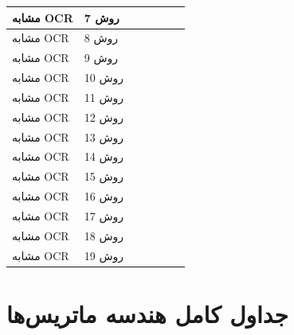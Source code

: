 \documentclass[a4paper,12pt]{article}
\begin{document}
\begin{landscape}
\begin{longtable}{|C{2cm}|C{2.5cm}|C{2.4cm}|C{2.4cm}|C{2.4cm}|C{2.5cm}|C{2.7cm}|}
\hline
مشابه OCR & روش 7 &  &  &  &  &  \\
\hline
مشابه OCR & روش 8 &  &  &  &  &  \\
\hline
مشابه OCR & روش 9 &  &  &  &  &  \\
\hline
مشابه OCR & روش 10 &  &  &  &  &  \\
\hline
مشابه OCR & روش 11 &  &  &  &  &  \\
\hline
مشابه OCR & روش 12 &  &  &  &  &  \\
\hline
مشابه OCR & روش 13 &  &  &  &  &  \\
\hline
مشابه OCR & روش 14 &  &  &  &  &  \\
\hline
مشابه OCR & روش 15 &  &  &  &  &  \\
\hline
مشابه OCR & روش 16 &  &  &  &  &  \\
\hline
مشابه OCR & روش 17 &  &  &  &  &  \\
\hline
مشابه OCR & روش 18 &  &  &  &  &  \\
\hline
مشابه OCR & روش 19 &  &  &  &  &  \\
\hline
\end{longtable}
\end{landscape}

\section{جداول کامل هندسه ماتریس‌ها}
\end{document}
